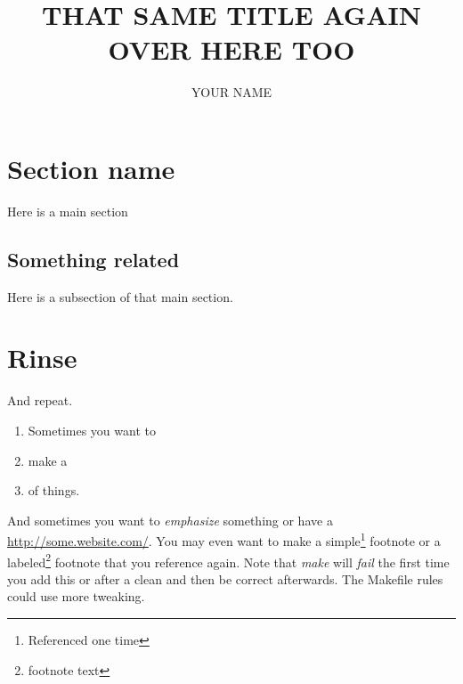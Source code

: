 \documentclass[prodmode]{kgwpstd} %
\begin{document}

\title{THAT SAME TITLE AGAIN OVER HERE TOO}
\author{YOUR NAME}

\begin{bottomstuff}
\end{bottomstuff}

\maketitle

\section{Section name}

Here is a main section

\subsection{Something related}

Here is a subsection of that main section.

\section{Rinse}

And repeat.

\begin{enumerate}
	\item Sometimes you want to
	\item make a
	\item of things.
\end{enumerate}

And sometimes you want to \emph{emphasize} something or have a
\url{http://some.website.com/}.  You may even want to make a
simple\footnote{Referenced one time} footnote or a
labeled\footnote{\label{labelname}footnote text} footnote that you reference
again\footnotemark[\ref{labelname}].  Note that \emph{make} will \emph{fail}
the first time you add this or after a clean and then be correct afterwards.
The Makefile rules could use more tweaking.
\end{document}
